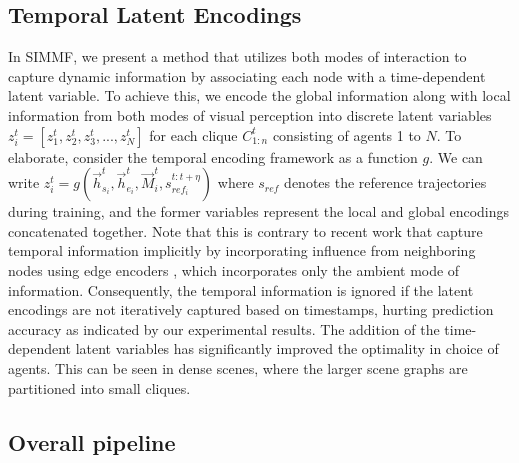 \documentclass[letterpaper, 10 pt, conference]{ieeeconf}  %
\begin{document}
\subsection{Temporal Latent Encodings}
In SIMMF, we present a method that utilizes both modes of interaction to capture dynamic information by associating each node with a time-dependent latent variable. To achieve this, we encode the 
global information along with local information from both modes of visual perception into discrete latent variables 
$z^t_i = [z^t_1, z^t_2, z^t_3, ..., z^t_N]$ 
for each clique $C^t_{1:n}$ consisting of agents 1 to $N$. To elaborate, consider the temporal encoding framework as a function $g$. We can write 
$z_i^{t} = g(\vec h_{s_i}^{t},\vec h_{e_i}^{t}, \vec M_i^t,s_{{ref}_i}^{t:t+\eta})$ where $s_{ref}$ denotes the reference trajectories during training, and the former variables represent the local and global encodings concatenated together. Note that this is contrary to recent work that capture temporal information implicitly by incorporating influence from neighboring nodes using edge encoders \cite{salzmann2021trajectron}, which incorporates only the ambient mode of information. 
Consequently, the temporal information is ignored if the latent encodings are not iteratively captured based on timestamps, hurting prediction accuracy as indicated by our experimental results. The addition of the time-dependent latent variables has significantly improved the optimality in choice of agents. This can be seen in dense scenes, where the larger scene graphs are partitioned into small cliques. \vspace{-0.05in}\subsection{Overall pipeline}
\end{document}
